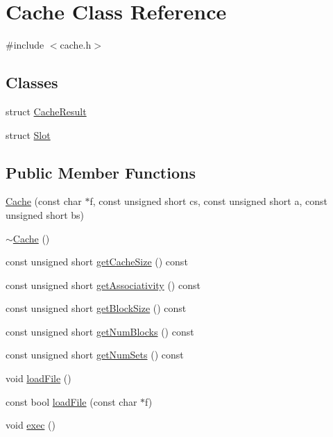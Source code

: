 \hypertarget{class_cache}{\section{Cache Class Reference}
\label{class_cache}
}


{\ttfamily \#include $<$cache.\-h$>$}

\subsection*{Classes}
\begin{DoxyCompactItemize}
\item 
struct \hyperlink{struct_cache_1_1_cache_result}{Cache\-Result}
\item 
struct \hyperlink{struct_cache_1_1_slot}{Slot}
\end{DoxyCompactItemize}
\subsection*{Public Member Functions}
\begin{DoxyCompactItemize}
\item 
\hyperlink{class_cache_a9bf5d91565ba9b3994e3339b26b04ee7}{Cache} (const char $\ast$f, const unsigned short cs, const unsigned short a, const unsigned short bs)
\item 
\hyperlink{class_cache_af8b171a6c49d88d3ba179477484b9d48}{$\sim$\-Cache} ()
\item 
const unsigned short \hyperlink{class_cache_a46a3d359f2ff92e839025afb8942165f}{get\-Cache\-Size} () const 
\item 
const unsigned short \hyperlink{class_cache_a49477979b9631d543e1a4244d22c7ec3}{get\-Associativity} () const 
\item 
const unsigned short \hyperlink{class_cache_a4ae1050bca924134e2fbebe214ac80f3}{get\-Block\-Size} () const 
\item 
const unsigned short \hyperlink{class_cache_a7e47fb5e7bbe8beb1a89df0ef716ca56}{get\-Num\-Blocks} () const 
\item 
const unsigned short \hyperlink{class_cache_a26879a3e4ab7bb95e96754a3994d860f}{get\-Num\-Sets} () const 
\item 
void \hyperlink{class_cache_a8345d091d431c67defbbde74b64cfb2d}{load\-File} ()
\item 
const bool \hyperlink{class_cache_abd6cf0aca0bcf68b8e99c69f1323e612}{load\-File} (const char $\ast$f)
\item 
void \hyperlink{class_cache_aa9b5d782c479b44358f734ed0be98b30}{exec} ()
\end{DoxyCompactItemize}
